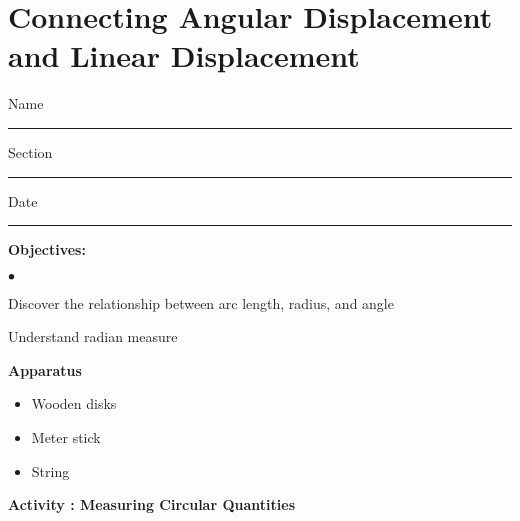 
\section{Connecting Angular Displacement and Linear Displacement}

Name \rule{2.0in}{0.1pt}\hfill{}Section \rule{1.0in}{0.1pt}\hfill{}Date \rule{1.0in}{0.1pt}

{\noindent \bf Objectives:}

\begin{list}{$\bullet$}{\itemsep0pt }

\item Discover the relationship between arc length, radius, and angle \item Understand radian measure

\end{list}

\textbf{Apparatus}

\begin{itemize}
\item Wooden disks
\item Meter stick
\item String
\end{itemize}
\textbf{Activity  : Measuring Circular Quantities} 


